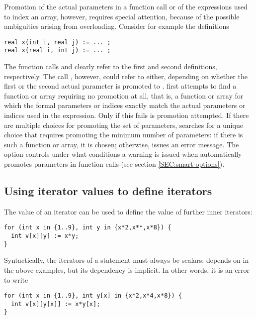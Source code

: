 Promotion of the actual parameters in a function call or of the
expressions used to index an array, however, requires special
attention, because of the possible ambiguities arising from
overloading.  Consider for example the definitions
\begin{lstlisting}
real x(int i, real j) := ... ;
real x(real i, int j) := ... ;
\end{lstlisting}
The function calls  and  clearly refer to
the first and second definitions, respectively.  The call ,
however, could refer to either, depending on whether the first or the
second actual parameter is promoted to .
{\smart} first attempts to find a function or array requiring no promotion at
all, that is, a function or array for which the formal parameters or indices
exactly match the actual parameters or indices used in the expression.
Only if this fails is promotion attempted.
If there are multiple choices for promoting the set of parameters,
{\smart} searches for a unique choice that requires promoting the minimum
number of parameters: if there is such a function or array, it is chosen;
otherwise, {\smart} issues an error message.
The option  controls under what conditions a warning is
issued when {\smart} automatically promotes parameters in function calls
(see section \ref{SEC:smart-options}).

\begin{comment}
Finally, note that a set of integers, \Code{\{int\}}, cannot be promoted
(neither automatically nor explicitly) to a set of reals, \Code{\{real\}}.
Thus, in the following, the former works but the latter is an error:
\begin{lstlisting}
for (real r in {1..5..1.0}) { ... }
for (real r in {1..5..1})   { ... }
\end{lstlisting}
\end{comment}


\subsection{Using iterator values to define iterators}

The value of an iterator can be used to define the value of further inner
iterators:
\begin{lstlisting}
for (int x in {1..9}, int y in {x*2,x**,x*8}) {
  int v[x][y] := x*y;
}
\end{lstlisting}

Syntactically, the iterators of a  statement must always be
scalars:  depends on  in the above examples, but its
dependency is implicit.
In other words, it is an error to write
\begin{lstlisting}
for (int x in {1..9}, int y[x] in {x*2,x*4,x*8}) {
  int v[x][y[x]] := x*y[x];
}
\end{lstlisting}

